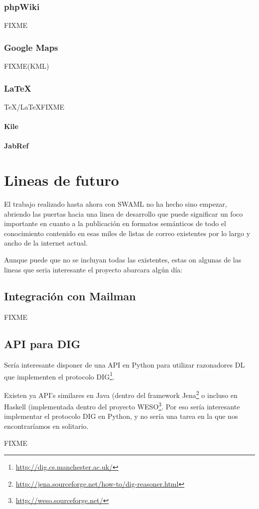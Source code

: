 \subsubsection{phpWiki}

FIXME

\subsubsection{Google Maps}

FIXME(KML)

\subsubsection{\LaTeX}

\TeX/\LaTeX FIXME

\paragraph{Kile}

\paragraph{JabRef}

\section{Lineas de futuro}

El trabajo realizado hasta ahora con SWAML no ha hecho sino empezar, abriendo las 
puertas hacia una linea de desarrollo que puede significar un foco importante
en cuanto a la publicación en formatos semánticos de todo el conocimiento contenido
en esas miles de listas de correo existentes por lo largo y ancho de la internet
actual.

Aunque puede que no se incluyan todas las existentes, estas on algunas de las lineas
que seria interesante el proyecto abarcara algún día:

\subsection*{Integración con Mailman}

FIXME

\subsection*{API para DIG}

Sería interesante disponer de una API en Python para utilizar razonadores DL que implementen 
el protocolo DIG\footnote{\url{http://dig.cs.manchester.ac.uk/}}. 

Existen ya API's similares en Java (dentro del framework
Jena\footnote{\url{http://jena.sourceforge.net/how-to/dig-reasoner.html}} o incluso en Haskell 
(implementada dentro del proyecto WESO\footnote{\url{http://weso.sourceforge.net/}}. Por eso 
sería interesante implementar el protocolo DIG en Python, y no sería una tarea
en la que nos encontraríamos en solitario\cite{PythonOWL}.

FIXME

